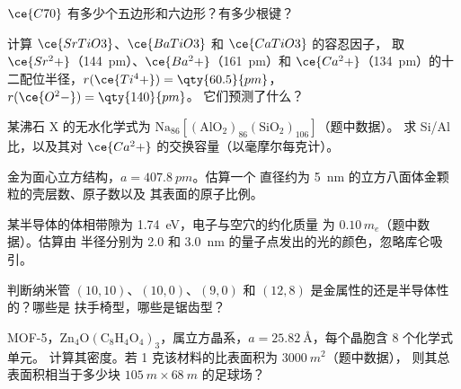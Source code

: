 \begin{exercise}[$\star$]\label{exo:b3:inorganic-materials:4}
$\ce{C70}$ 有多少个五边形和六边形？有多少根键？
\end{exercise}

\begin{exercise}[$\star\star$]\label{exo:b3:inorganic-materials:5}
计算 $\ce{SrTiO3}$、$\ce{BaTiO3}$ 和 $\ce{CaTiO3}$ 的容忍因子，
取 $\ce{Sr^2+}$（\qty{144}{pm}）、$\ce{Ba^2+}$（\qty{161}{pm}）和 $\ce{Ca^2+}$（\qty{134}{pm}）的十二配位半径，$r(\ce{Ti^4+}) = \qty{60.5}{pm}$，$r(\ce{O^2-}) = \qty{140}{pm}$。
它们预测了什么？
\end{exercise}

\begin{exercise}[$\star\star$]\label{exo:b3:inorganic-materials:6}
某沸石 X 的无水化学式为 $\mathrm{Na_{86}[(AlO_2)_{86}(SiO_2)_{106}]}$（题中数据）。
求 Si/Al 比，以及其对 $\ce{Ca^2+}$ 的交换容量（以毫摩尔每克计）。
\end{exercise}

\begin{exercise}[$\star\star$]\label{exo:b3:inorganic-materials:7}
金为面心立方结构，$a = \qty{407.8}{pm}$。估算一个
直径约为 \qty{5}{nm} 的立方八面体金颗粒的壳层数、原子数以及
其表面的原子比例。
\end{exercise}

\begin{exercise}[$\star\star$]\label{exo:b3:inorganic-materials:8}
某半导体的体相带隙为 \qty{1.74}{eV}，电子与空穴的约化质量
为 $0.10\,m_e$（题中数据）。估算由
半径分别为 2.0 和 \qty{3.0}{nm} 的量子点发出的光的颜色，忽略库仑吸引。
\end{exercise}

\begin{exercise}[$\star\star$]\label{exo:b3:inorganic-materials:9}
判断纳米管 $(10, 10)$、$(10, 0)$、$(9, 0)$ 和 $(12, 8)$ 是金属性的还是半导体性的？哪些是
扶手椅型，哪些是锯齿型？
\end{exercise}

\begin{exercise}[$\star\star\star$]\label{exo:b3:inorganic-materials:10}
MOF-5，$\mathrm{Zn_4O(C_8H_4O_4)_3}$，属立方晶系，$a = \qty{25.82}{\angstrom}$，每个晶胞含 8 个化学式单元。
计算其密度。若 1 克该材料的比表面积为 $\qty{3000}{m^2}$（题中数据），
则其总表面积相当于多少块 $\qty{105}{m} \times \qty{68}{m}$ 的足球场？
\end{exercise}

